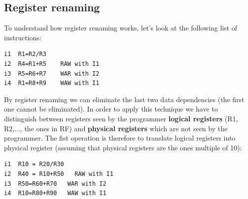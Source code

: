 



\subsection{Register renaming}
To understand how register renaming works, let's look at the following list of
instructions:
\begin{verbatim}
i1  R1=R2/R3
i2  R4=R1+R5    RAW with I1
i3  R5=R6+R7    WAR with I2
i4  R1=R8+R9    WAW with I1
\end{verbatim}

By register renaming we can eliminate the last two data dependencies (the first
one cannot be eliminated). In order to apply this technique we have to
distinguish between registers seen by the programmer \textbf{logical registers}
(R1, R2,..., the ones in RF) and \textbf{physical registers} which are not seen
by the programmer. The fist operation is therefore to translate logical
registers into physical register (assuming that physical registers are the ones
multiple of 10):
\begin{verbatim}
i1  R10 = R20/R30
i2  R40 = R10+R50   RAW with I1
i3  R50=R60+R70   WAR with I2
i4  R10=R80+R90   WAW with I1
\end{verbatim}

